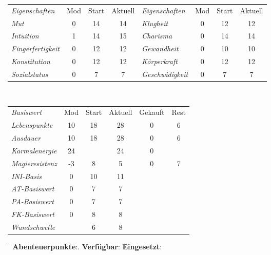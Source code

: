 \documentclass{article}
\begin{document}
  \begin{table}[!h]
    \begin{tabularx}{\textwidth}{|X|cc|c|X|cc|c|}
      \hline
      \rowcolor{gray}\emph{Eigenschaften}& Mod& Start & Aktuell & \emph{Eigenschaften}& Mod& Start & Aktuell\\
      \rowcolor{white}\emph{Mut}& 0& 14& 14&
      \emph{Klugheit}& 0& 12& 12\\
      \rowcolor{white}\emph{Intuition}& 1& 14& 15&
      \emph{Charisma}& 0& 14& 14\\
      \rowcolor{white}\emph{Fingerfertigkeit}& 0& 12& 12&
      \emph{Gewandheit}& 0& 10& 10\\
      \rowcolor{white}\emph{Konstitution}& 0& 12& 12&
      \emph{Körperkraft}& 0& 12& 12\\
      \rowcolor{white}\emph{Sozialstatus}& 0& 7& 7&
      \emph{Geschwidigkeit}& 0& 7& 7\\	
      \hline
    \end{tabularx}\\
    \begin{tabularx}{0.65\textwidth}{|X|cc|c|cc|}
      \hline
      \rowcolor{gray}\emph{Basiswert}& Mod& Start& Aktuell& Gekauft& Rest\\
      \rowcolor{white}\emph{Lebenspunkte}& 10& 18& 28& 0& 6\\
      \rowcolor{white}\emph{Ausdauer}& 10& 18& 28& 0& 6\\
      \rowcolor{white}\emph{Karmalenergie}& 24& & 24& 0& \\
      \rowcolor{white}\emph{Magieresistenz}&-3&  8&  5& 0& 7\\
      \rowcolor{white}\emph{INI-Basis}& 0& 10& 11&  &  \\ 
      \rowcolor{white}\emph{AT-Basiswert}& 0&  7&  7&  &  \\
      \rowcolor{white}\emph{PA-Basiswert}& 0&  7&  7&  &  \\
      \rowcolor{white}\emph{FK-Basiswert}& 0&  8&  8&  &  \\
      \rowcolor{white}\emph{Wundschwelle}&  &  6&  8&  &  \\
      \hline
    \end{tabularx}
  \end{table}

  \begin{mycolorbox}
    \begin{tabbing}
      \hspace{0.33\textwidth} \= \hspace{0.33\textwidth} \= \kill
      \textbf{Abenteuerpunkte}:.\>
      \textbf{Verfügbar}: \>
      \textbf{Eingesetzt}: \quad
    \end{tabbing}
  \end{mycolorbox}
  \clearpage
\end{document}
